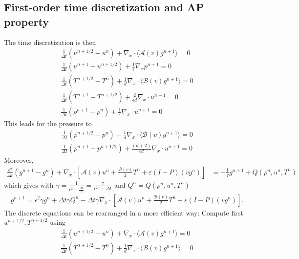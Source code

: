 \documentclass[final,11pt]{siamart251216}
\numberwithin{equation}{section}
\theoremstyle{definition}
\theoremstyle{remark}
\begin{document}
\subsection{First-order time discretization and AP property}
The time discretization is then
\begin{align}
\frac{1}{\Delta t } (u^{n+1/2}- u^{n})+   \nabla_x \cdot \langle \mathcal{A}(v) g^{n+1}  \rangle =0 \nonumber\\
\frac{1}{\Delta t } (u^{n+1}- u^{n+1/2})+ \frac{1}{\epsilon} \nabla_x p^{n+1}=0\label{us}\\
\frac{1}{\Delta t } (T^{n+1/2}- T^{n})+ \frac{1}{d}\nabla_x\cdot \langle \mathcal{B}(v) g^{n+1} \rangle= 0\nonumber\\
\frac{1}{\Delta t } (T^{n+1}- T^{n+1/2})+ \frac{2}{\epsilon d}\nabla_x\cdot u^{n+1} = 0\nonumber\\
\frac{1}{\Delta t } (\rho^{n+1}- \rho^{n})+ \frac{1}{\epsilon }\nabla_x\cdot u^{n+1} = 0\nonumber
\end{align}
This leads for the pressure to
\begin{align}
\frac{1}{\Delta t } (p^{n+1/2}- p^{n})+ \frac{1}{d}\nabla_x\cdot \langle \mathcal{B}(v) g^{n+1} \rangle = 0\nonumber\\
\frac{1}{\Delta t } (p^{n+1}- p^{n+1/2})+ \frac{(d+2)}{\epsilon d}\nabla_x\cdot u^{n+1} = 0\label{ps}
\end{align}
Moreover,
\begin{eqnarray*}
	\frac{\varepsilon^2}{\Delta t} (g^{n+1} -g^n) +  \nabla_x \cdot \left[ \mathcal{A}(v) u^n + \frac{\mathcal{B}(v)}{2}T^n + \varepsilon (I-P)(vg^n) \right]&= -  \frac{1}{\tau} g^{n+1} + Q(\rho^n,u^n,T^n)
\end{eqnarray*}
which gives 
with $\gamma = \frac{1}{\epsilon^2 + \frac{\Delta t}{\tau} }=  \frac{\tau }{\epsilon^2 \tau + \Delta t}$
and $Q^n =Q(\rho^n,u^n,T^n)$
\begin{eqnarray}
\label{Gamma}
g^{n+1}= \epsilon^2 \gamma g^n+ \Delta t \gamma Q^n-\Delta t \gamma \nabla_x \cdot \left[ \mathcal{A}(v) u^n + \frac{\mathcal{B}(v)}{2}T^n + \varepsilon (I-P)(vg^n) \right].
\end{eqnarray}
The discrete equations can be rearranged in a more efficient way:
Compute first $u^{n+1/2},T^{n+1/2}$ using 
\begin{align*}
	\frac{1}{\Delta t } (u^{n+1/2}- u^{n})+   \nabla_x \cdot \langle \mathcal{A}(v) g^{n+1}  \rangle  =0 \nonumber\\
	\frac{1}{\Delta t } (T^{n+1/2}- T^{n})+ \frac{1}{d}\nabla_x\cdot \langle \mathcal{B}(v) g^{n+1}  \rangle   = 0\nonumber
\end{align*}
\end{document}
